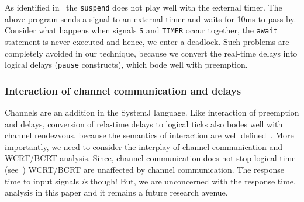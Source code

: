 As identified in~\cite{Bourke2009a} the \texttt{suspend} does not play
well with the external timer. The above program sends a signal to an
external timer and waits for 10ms to pass by. Consider what happens when
signals \texttt{S} and \texttt{TIMER} occur together, the \texttt{await}
statement is never executed and hence, we enter a deadlock. Such
problems are completely avoided in our technique, because we convert the
real-time delays into logical delays (\texttt{pause} constructs), which
bode well with preemption.

\subsubsection{Interaction of channel communication and delays}
\label{sec:inter-chann-comm}

Channels are an addition in the SystemJ language. Like interaction of
preemption and delays, conversion of rela-time delays to logical ticks
also bodes well with channel rendezvous, because the semantics of
interaction are well defined~\cite{amal10}. More importantly, we need to
consider the interplay of channel communication and WCRT/BCRT
analysis. Since, channel communication does not stop logical time
(see~\cite{amal10}) WCRT/BCRT are unaffected by channel
communication. The response time to input signals \textit{is} though!
But, we are unconcerned with the response time, analysis in this paper
and it remains a future research avenue.


